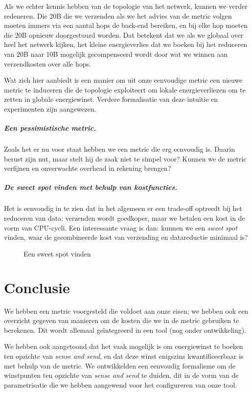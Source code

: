 \documentclass{article}
\begin{document}
Als we echter kennis hebben van de topologie van het netwerk, kunnen we verder
redeneren. Die 20B die we verzenden als we het advies van de metric volgen
moeten immers via een aantal hops de back-end bereiken, en bij elke hop moeten
die 20B opnieuw doorgestuurd worden. Dat betekent dat we als we globaal over
heel het netwerk kijken, het kleine energieverlies dat we boeken bij het
reduceren van 20B naar 10B mogelijk gecompenseerd wordt door wat we winnen aan
verzendkosten over alle hops.

Wat zich hier aanbiedt is een manier om uit onze eenvoudige metric een nieuwe
metric te induceren die de topologie exploiteert om lokale energieverliezen om
te zetten in globale energiewinst. Verdere formalisatie van deze intu\"itie en
experimenten zijn aangewezen.

\subparagraph{Een pessimistische metric.}

Zoals het er nu voor staat hebben we een metric die erg eenvoudig is. Daarin
berust zijn nut, maar stelt hij de zaak niet te simpel voor? Kunnen we de metric
verfijnen en onverwachte overhead in rekening brengen? 




\subparagraph{De \textit{sweet spot} vinden met behulp van kostfuncties.}

Het is eenvoudig in te zien dat in het algemeen er een trade-off optreedt
bij het reduceren van data: verzenden wordt goedkoper, maar we betalen een kost
in de vorm van CPU-cycli. Een interessante vraag is dan: kunnen we een
\textit{sweet spot} vinden, waar de gecombineerde kost van verzending en
datareductie minimaal is?

\begin{figure}[h]
\centering
\missingfigure{}
\caption{Een sweet spot vinden}
\label{fig:sweet_spot}
\end{figure}

\section{Conclusie}

We hebben een metric voorgesteld die voldoet aan onze eisen; we hebben ook een
overzicht gegeven van manieren om de kosten die we in de metric gebruiken te
berekenen. Dit wordt allemaal ge\"integreerd in een tool (nog onder
ontwikkeling).

We hebben ook aangetoond dat het vaak mogelijk is om energiewinst te boeken ten
opzichte van \textit{sense and send}, en dat deze winst enigszins
kwantificeerbaar is met behulp van de metric. We ontwikkelden een eenvoudig
formalisme om de winstpunten ten opzichte van \textit{sense and send} te duiden,
dit in de vorm van de parametrisatie die we hebben aangewend voor het
configureren van onze tool.
\end{document}
